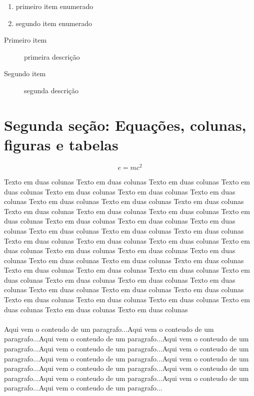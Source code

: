 \documentclass[12pt,a4paper]{article}
\begin{document}
\begin{enumerate}
\item primeiro item enumerado
\item segundo item enumerado
\end{enumerate}

\begin{description}
\item[Primeiro item] primeira descrição
\item[Segundo item] segunda descrição
\end{description}
\newpage

\newpage
\section{Segunda seção: Equações, colunas, figuras e tabelas}

\begin{equation}
e = mc^2
\end{equation}


\begin{multicols}{2} %
Texto em duas colunas Texto em duas colunas Texto em duas colunas Texto em duas colunas Texto em duas colunas Texto em duas colunas Texto em duas colunas Texto em duas colunas Texto em duas colunas Texto em duas colunas Texto em duas colunas Texto em duas colunas Texto em duas colunas Texto em duas colunas Texto em duas colunas Texto em duas colunas Texto em duas colunas Texto em duas colunas Texto em duas colunas Texto em duas colunas Texto em duas colunas Texto em duas colunas Texto em duas colunas Texto em duas colunas Texto em duas colunas Texto em duas colunas Texto em duas colunas Texto em duas colunas Texto em duas colunas Texto em duas colunas Texto em duas colunas Texto em duas colunas Texto em duas colunas Texto em duas colunas Texto em duas colunas Texto em duas colunas Texto em duas colunas Texto em duas colunas Texto em duas colunas Texto em duas colunas Texto em duas colunas Texto em duas colunas Texto em duas colunas Texto em duas colunas Texto em duas colunas Texto em duas colunas 
\end{multicols}

\paragraph{} Aqui vem o conteudo de um paragrafo...Aqui vem o conteudo de um paragrafo...Aqui vem o conteudo de um paragrafo...Aqui vem o conteudo de um paragrafo...Aqui vem o conteudo de um paragrafo...Aqui vem o conteudo de um paragrafo...Aqui vem o conteudo de um paragrafo...Aqui vem o conteudo de um paragrafo...Aqui vem o conteudo de um paragrafo...Aqui vem o conteudo de um paragrafo...Aqui vem o conteudo de um paragrafo...Aqui vem o conteudo de um paragrafo...Aqui vem o conteudo de um paragrafo...
\end{document}
